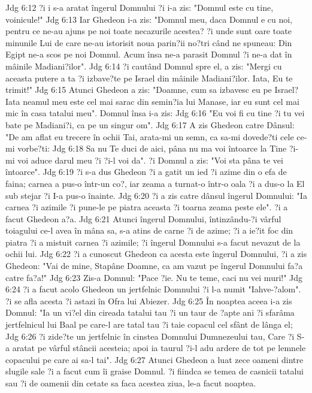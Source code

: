 Jdg 6:12  ?i i s-a aratat îngerul Domnului ?i i-a zis: "Domnul este cu tine, voinicule!"
Jdg 6:13  Iar Ghedeon i-a zis: "Domnul meu, daca Domnul e cu noi, pentru ce ne-au ajuns pe noi toate necazurile acestea? ?i unde sunt oare toate minunile Lui de care ne-au istorisit noua parin?ii no?tri când ne spuneau: Din Egipt ne-a scos pe noi Domnul. Acum însa ne-a parasit Domnul ?i ne-a dat în mâinile Madiani?ilor".
Jdg 6:14  ?i cautând Domnul spre el, a zis: "Mergi cu aceasta putere a ta ?i izbave?te pe Israel din mâinile Madiani?ilor. Iata, Eu te trimit!"
Jdg 6:15  Atunci Ghedeon a zis: "Doamne, cum sa izbavesc eu pe Israel? Iata neamul meu este cel mai sarac din semin?ia lui Manase, iar eu sunt cel mai mic în casa tatalui meu". Domnul însa i-a zis:
Jdg 6:16  "Eu voi fi cu tine ?i tu vei bate pe Madiani?i, ca pe un singur om".
Jdg 6:17  A zis Ghedeon catre Dânsul: "De am aflat eu trecere în ochii Tai, arata-mi un semn, ca sa-mi dovede?ti cele ce-mi vorbe?ti:
Jdg 6:18  Sa nu Te duci de aici, pâna nu ma voi întoarce la Tine ?i-mi voi aduce darul meu ?i ?i-l voi da". ?i Domnul a zis: "Voi sta pâna te vei întoarce".
Jdg 6:19  ?i s-a dus Ghedeon ?i a gatit un ied ?i azime din o efa de faina; carnea a pus-o într-un co?, iar zeama a turnat-o într-o oala ?i a dus-o la El sub stejar ?i I-a pus-o înainte.
Jdg 6:20  ?i a zis catre dânsul îngerul Domnului: "Ia carnea ?i azimile ?i pune-le pe piatra aceasta ?i toarna zeama peste ele". ?i a facut Ghedeon a?a.
Jdg 6:21  Atunci îngerul Domnului, întinzându-?i vârful toiagului ce-l avea în mâna sa, s-a atins de carne ?i de azime; ?i a ie?it foc din piatra ?i a mistuit carnea ?i azimile; ?i îngerul Domnului s-a facut nevazut de la ochii lui.
Jdg 6:22  ?i a cunoscut Ghedeon ca acesta este îngerul Domnului, ?i a zis Ghedeon: "Vai de mine, Stapâne Doamne, ca am vazut pe îngerul Domnului fa?a catre fa?a!"
Jdg 6:23  Zis-a Domnul: "Pace ?ie. Nu te teme, caci nu vei muri!"
Jdg 6:24  ?i a facut acolo Ghedeon un jertfelnic Domnului ?i l-a numit "Iahve-?alom". ?i se afla acesta ?i astazi în Ofra lui Abiezer.
Jdg 6:25  În noaptea aceea i-a zis Domnul: "Ia un vi?el din cireada tatalui tau ?i un taur de ?apte ani ?i sfarâma jertfelnicul lui Baal pe care-l are tatal tau ?i taie copacul cel sfânt de lânga el;
Jdg 6:26  ?i zide?te un jertfelnic în cinstea Domnului Dumnezeului tau, Care ?i S-a aratat pe vârful stâncii acesteia; apoi ia taurul ?i-l adu ardere de tot pe lemnele copacului pe care ai sa-l tai".
Jdg 6:27  Atunci Ghedeon a luat zece oameni dintre slugile sale ?i a facut cum îi graise Domnul. ?i fiindca se temea de casnicii tatalui sau ?i de oamenii din cetate sa faca acestea ziua, le-a facut noaptea.

